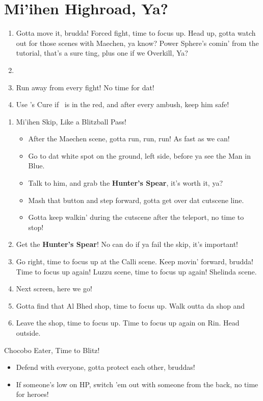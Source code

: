 \chapter{Mi'ihen Highroad, Ya?}

\begin{enumerate}
\item Gotta move it, brudda! Forced fight, time to focus up. Head up, gotta watch out for those scenes with Maechen, ya know? Power Sphere's comin' from the tutorial, that's a sure ting, plus one if we Overkill, Ya?
\item \formation{\tidus}{\wakka}{\auron}
\item Run away from every fight! No time for dat!
\item Use \yuna's Cure if \tidus\ is in the red, and after every ambush, keep him safe!
\end{enumerate}
\wincb\losscb\bothcb
\begin{enumerate}[resume]
\item {Mi'ihen Skip, Like a Blitzball Pass!}
\begin{itemize}
\item After the Maechen scene, gotta run, run, run! As fast as we can!
\item Go to dat white spot on the ground, left side, before ya see the Man in Blue.
\item Talk to him, and grab the \textbf{Hunter's Spear}, it's worth it, ya?
\item Mash that button and step forward, gotta get over dat cutscene line.
\item Gotta keep walkin' during the cutscene after the teleport, no time to stop!
\end{itemize}
\item Get the \textbf{Hunter's Spear}! No can do if ya fail the skip, it's important!
\item Go right, time to focus up at the Calli scene. Keep movin' forward, brudda! Time to focus up again! Luzzu scene, time to focus up again! Shelinda scene.
\item Next screen, here we go!
\item Gotta find that Al Bhed shop, time to focus up. Walk outta da shop and \cs[5:30]
\item Leave the shop, time to focus up. Time to focus up again on Rin. Head outside.
\end{enumerate}
\begin{battle}{Chocobo Eater, Time to Blitz!}
\begin{itemize}
\tidusf Haste dat Boss, Gotta be quick like a blitz!
\item Defend with everyone, gotta protect each other, bruddas!
\item If someone's low on HP, switch 'em out with someone from the back, no time for heroes!
\end{itemize}
\end{battle}

